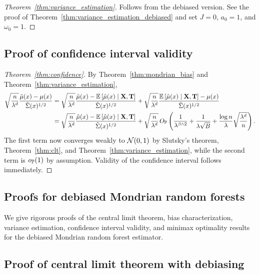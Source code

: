 \begin{proof}[Theorem~\ref{thm:variance_estimation}]
  Follows from the debiased version.
  See the proof of Theorem~\ref{thm:variance_estimation_debiased}
  and set $J=0$,
  $a_0 = 1$, and $\omega_0 = 1$.
\end{proof}

\subsection*{Proof of confidence interval validity}

\begin{proof}[Theorem~\ref{thm:confidence}]
  By Theorem~\ref{thm:mondrian_bias}
  and Theorem~\ref{thm:variance_estimation},
  \begin{align*}
    \sqrt{\frac{n}{\lambda^d}}
    \frac{\hat \mu(x) - \mu(x)}{\hat \Sigma(x)^{1/2}}
    &=
    \sqrt{\frac{n}{\lambda^d}}
    \frac{\hat \mu(x) - \E \left[ \hat \mu(x) \mid \bX, \bT \right]}
    {\hat \Sigma(x)^{1/2}}
    + \sqrt{\frac{n}{\lambda^d}}
    \frac{\E \left[ \hat \mu(x) \mid \bX, \bT \right] - \mu(x)}
    {\hat \Sigma(x)^{1/2}} \\
    &=
    \sqrt{\frac{n}{\lambda^d}}
    \frac{\hat \mu(x) - \E \left[ \hat \mu(x) \mid \bX, \bT \right]}
    {\hat \Sigma(x)^{1/2}}
    + \sqrt{\frac{n}{\lambda^d}} \,
    O_\P \left(
      \frac{1}{\lambda^{\beta \wedge 2}}
      + \frac{1}{\lambda \sqrt B}
      + \frac{\log n}{\lambda} \sqrt{\frac{\lambda^d}{n}}
    \right).
  \end{align*}
  The first term now converges weakly to $\cN(0,1)$ by
  Slutsky's theorem, Theorem~\ref{thm:clt},
  and Theorem~\ref{thm:variance_estimation},
  while the second term is $o_\P(1)$ by assumption.
  Validity of the confidence interval follows immediately.
\end{proof}

\subsection{Proofs for debiased Mondrian random forests}

We give rigorous proofs of the central limit theorem,
bias characterization, variance estimation,
confidence interval validity, and minimax optimality
results for the debiased Mondrian random forest estimator.

\subsection*{Proof of central limit theorem with debiasing}

